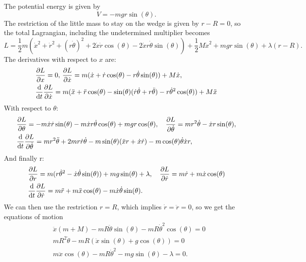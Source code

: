 \documentclass{article}
\begin{document}
        The potential energy is given by
        \begin{equation*}
            V = -m g r \sin(\theta).
        \end{equation*}
        The restriction of the little mass to stay on the wedge is given by $r - R = 0$, so the total Lagrangian, including the undetermined multiplier becomes
        \begin{equation*}
            L = \frac{1}{2}m \left(\dot x^2 + \dot r^2 + (r \dot \theta)^2+ 2 \dot x \dot r \cos(\theta) - 2 \dot x r \dot \theta \sin(\theta) \right) + \frac{1}{2}M \dot x^2 + mgr\sin(\theta) + \lambda(r - R).
        \end{equation*}
        The derivatives with respect to $x$ are:
        \begin{align*}
            &\pdv{L}{x} = 0, \, \pdv{L}{\dot x} = m (\dot x +  \dot r \cos(\theta) -  r \dot \theta \sin(\theta)) + M \dot x, \\
            &\dv{t}\pdv{L}{\dot x} = m(\ddot x + \ddot r \cos(\theta) - \sin(\theta)(\dot r \dot \theta + r \ddot \theta) -  r \dot \theta^2 \cos(\theta)) + M \ddot x
        \end{align*}
        With respect to $\theta$:
        \begin{align*}
            & \pdv{L}{\theta} = - m \dot x \dot r \sin(\theta) - m \dot x r \dot \theta \cos(\theta) + m g r \cos(\theta), \quad  \pdv{L}{\dot \theta} = m r^2 \dot \theta -  \dot x r \sin(\theta), \\
            &\dv{t} \pdv{L}{\dot \theta} = m r^2 \ddot \theta + 2m r \dot r \dot \theta - m \sin(\theta)( \ddot x r + \dot x \dot r) -  m \cos(\theta) \dot \theta \dot x r,
        \end{align*}
        And finally r:
        \begin{align*}
            & \pdv{L}{r} = m(r \dot \theta^2 - \dot x \dot \theta \sin(\theta)) + m g \sin(\theta) + \lambda, \quad 
            \pdv{L}{\dot r} = m \dot r + m \dot x \cos(\theta)  \\
            & \dv{t} \pdv{L}{\dot r} = m \ddot r + m \ddot x \cos(\theta) - m \dot x \dot \theta \sin(\theta).
        \end{align*}
        We can then use the restriction $r = R$, which implies $\dot r = \ddot r = 0$, so we get the equations of motion
        \begin{align*}
            & \ddot x(m + M) - m R \ddot \theta \sin(\theta) - m R \dot \theta^2 \cos(\theta) = 0 \\
            & mR^2 \ddot \theta - mR (\ddot x \sin(\theta) + g\cos(\theta)) = 0 \\
            & m \ddot x \cos(\theta) - m R \dot \theta^2 - m g \sin(\theta) - \lambda = 0.
        \end{align*}
\end{document}
